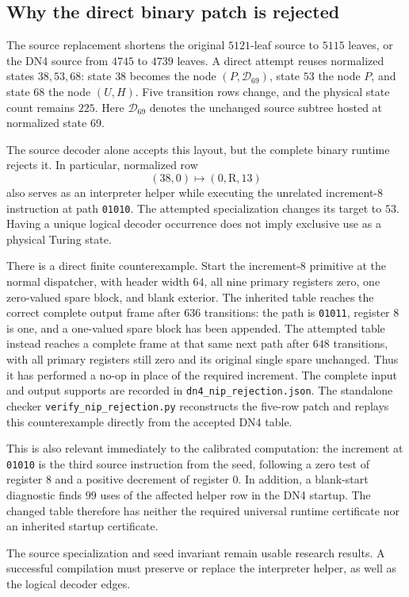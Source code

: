 \subsection{Why the direct binary patch is rejected}

The source replacement shortens the original $5121$-leaf source to
$5115$ leaves, or the DN4 source from $4745$ to $4739$ leaves.
A direct attempt reuses normalized states $38,53,68$:
state $38$ becomes the node $(P,\mathcal D_{69})$, state $53$ the node $P$,
and state $68$ the node $(U,H)$.  Five transition rows change, and the
physical state count remains $225$. Here $\mathcal D_{69}$ denotes the
unchanged source subtree hosted at normalized state 69.

The source decoder alone accepts this layout, but the complete binary
runtime rejects it.  In particular, normalized row
\[
 (38,0)\longmapsto(0,\mathrm R,13)
\]
also serves as an interpreter helper while executing the unrelated
increment-$8$ instruction at path \texttt{01010}.  The attempted
specialization changes its target to $53$.  Having a unique logical
decoder occurrence does not imply exclusive use as a physical Turing
state.

There is a direct finite counterexample.  Start the increment-$8$
primitive at the normal dispatcher, with header width $64$, all nine
primary registers zero, one zero-valued spare block, and blank exterior.
The inherited table reaches the correct complete output frame after
$636$ transitions: the path is \texttt{01011}, register $8$ is one,
and a one-valued spare block has been appended.  The attempted table
instead reaches a complete frame at that same next path after $648$
transitions, with all primary registers still zero and its original
single spare unchanged.  Thus it has performed a no-op in place of
the required increment.  The complete input and output supports are
recorded in \texttt{dn4\_nip\_rejection.json}.  The standalone checker
\texttt{verify\_nip\_rejection.py} reconstructs the five-row patch and
replays this counterexample directly from the accepted DN4 table.

This is also relevant immediately to the calibrated computation:
the increment at \texttt{01010} is the third source instruction from
the seed, following a zero test of register $8$ and a positive decrement
of register $0$.  In addition, a blank-start diagnostic finds $99$
uses of the affected helper row in the DN4 startup.  The changed
table therefore has neither the required universal runtime certificate
nor an inherited startup certificate.

The source specialization and seed invariant remain usable research
results.  A successful compilation must preserve or replace the
interpreter helper, as well as the logical decoder edges.
